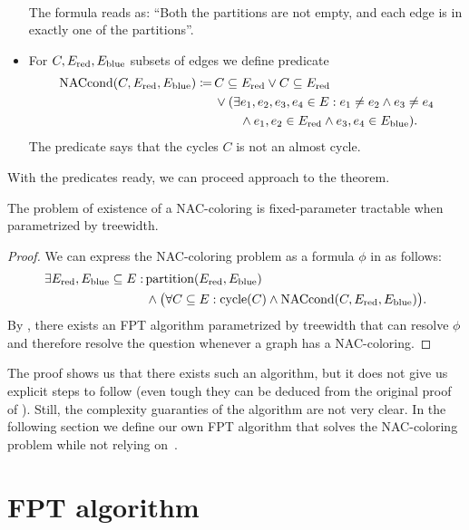 \begin{itemize}
\begin{align*}
	      \end{align*}
	      The formula reads as: ``Both the partitions are not empty,
	      and each edge is in exactly one of the partitions''.
	\item For \( C, E_{\text{red}}, E_{\text{blue}} \) subsets of edges we define predicate
	      \begin{align*}
		      \text{NACcond}(C, E_{\text{red}}, E_{\text{blue}}) \coloneqq \,
		       & C \subseteq E_{\text{red}} \lor C \subseteq E_{\text{red}}
		      \\
		       & \lor (\exists e_1, e_2, e_3, e_4 \in E :
		      e_1 \ne e_2 \land e_3 \ne e_4
		      \\
		       & \qquad \land e_1, e_2 \in E_{\text{red}} \land e_3, e_4 \in E_{\text{blue}} ).
	      \end{align*}
	      The predicate says that the cycles \( C \) is not an almost cycle.
\end{itemize}
%

With the predicates ready, we can proceed approach to the theorem.
%
\begin{theorem}
	The problem of existence of a NAC-coloring is fixed-parameter
	tractable when parametrized by treewidth.
\end{theorem}
%
\begin{proof}
	We can express the NAC-coloring problem
	as a formula \( \phi \) in \MSO{} as follows:
	\begin{align*}
		\exists E_{\text{red}}, E_{\text{blue}} \subseteq E : \,
		 & \text{partition}(E_{\text{red}}, E_{\text{blue}})                                                                 \\
		 & \land \big(\forall C \subseteq E : \text{cycle}(C) \land \text{NACcond}(C, E_{\text{red}}, E_{\text{blue}}) \big)
		.
	\end{align*}
	By ,
	there exists an FPT algorithm parametrized by treewidth
	that can resolve \( \phi \) and therefore resolve the question whenever a graph has a NAC-coloring.
\end{proof}
%
The proof shows us that there exists such an algorithm,
but it does not give us explicit steps to follow
(even tough they can be deduced from the original proof of ).
Still, the complexity guaranties of the algorithm are not very clear.
In the following section we define our
own FPT algorithm that solves the NAC-coloring problem
while not relying on~\MSO{}.

\section{FPT algorithm}

